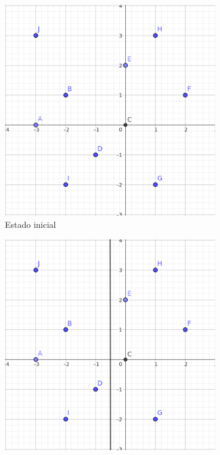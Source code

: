 \documentclass{article}
\begin{document}
\begin{figure}[H]
    \centering
    \begin{subfigure}[b]{0.3\textwidth}
        \centering
        \includegraphics[width=\textwidth]{P3/Prosa/ejemplo.png}
        \caption{\centering Estado inicial}
        \label{fig:p3_ejemplo}
    \end{subfigure}
    \hfill
    \begin{subfigure}[b]{0.3\textwidth}
        \centering
        \includegraphics[width=\textwidth]{P3/Prosa/ejemplo_partir.png}

\end{subfigure}
\end{figure}
\end{document}
